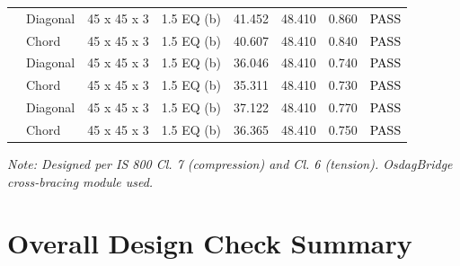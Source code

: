 \documentclass[12pt,a4paper]{report}
\numberwithin{table}{chapter}
\numberwithin{figure}{chapter}
\begin{document}
\begin{longtable}{|C{2.0cm}|L{1.8cm}|C{2.2cm}|C{3.0cm}|C{1.8cm}|C{1.8cm}|C{1.2cm}|C{1.8cm}|}
\hline
{} & Diagonal & 45 x 45 x 3 & 1.5 EQ (b) & 41.452 & 48.410 & 0.860 & \textcolor{black}{PASS} \\[6pt]
 & Chord & 45 x 45 x 3 & 1.5 EQ (b) & 40.607 & 48.410 & 0.840 & \textcolor{black}{PASS} \\[6pt]
\hline
{} & Diagonal & 45 x 45 x 3 & 1.5 EQ (b) & 36.046 & 48.410 & 0.740 & \textcolor{black}{PASS} \\[6pt]
 & Chord & 45 x 45 x 3 & 1.5 EQ (b) & 35.311 & 48.410 & 0.730 & \textcolor{black}{PASS} \\[6pt]
\hline
{} & Diagonal & 45 x 45 x 3 & 1.5 EQ (b) & 37.122 & 48.410 & 0.770 & \textcolor{black}{PASS} \\[6pt]
 & Chord & 45 x 45 x 3 & 1.5 EQ (b) & 36.365 & 48.410 & 0.750 & \textcolor{black}{PASS} \\[6pt]
\hline
\end{longtable}
\noindent\textit{Note: Designed per IS 800 Cl. 7 (compression) and Cl. 6 (tension). OsdagBridge cross-bracing module used.}

\section{Overall Design Check Summary}
\label{sec:overall-summary}
\end{document}
